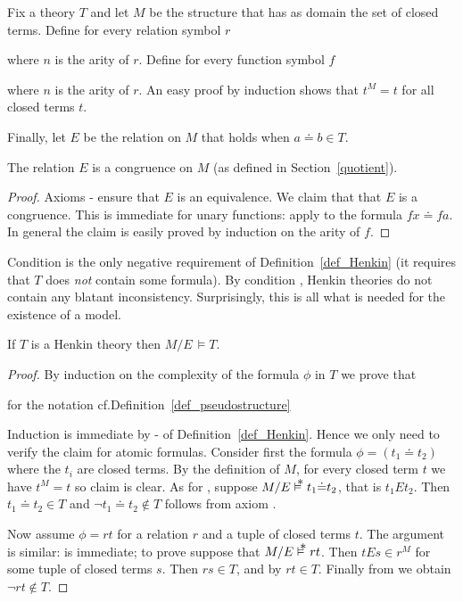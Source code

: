 Fix a theory $T$ and let \emph{$M$} be the structure that has as domain the set of closed terms. Define for every relation symbol $r$


where $n$ is the arity of $r$.
%
Define for every function symbol $f$


where $n$ is the arity of $r$.
%
An easy proof by induction shows that $t^M=t$ for all closed terms $t$. 

Finally, let \emph{$E$} be the relation on $M$ that holds when $a{\doteq}b\in T$. 

\begin{lemma}
The relation $E$ is a congruence on $M$ (as defined in Section~\ref{quotient}).
\end{lemma}

\begin{proof}
Axioms - ensure that $E$ is an equivalence. We claim that that $E$ is a congruence. This is immediate for unary functions: apply  to the formula $fx\doteq fa$. In general the claim is easily proved by induction on the arity of $f$.
\end{proof}

Condition  is the only negative requirement of Definition~\ref{def_Henkin} (it requires that $T$ does \textit{not\/} contain some formula). By condition , Henkin theories do not contain any blatant inconsistency. Surprisingly, this is all what is needed for the existence of a model.

\begin{theorem}
If $T$ is a Henkin theory then $M{/}E\,\models T$. 
\end{theorem}

\begin{proof}
By induction on the complexity of the formula $\phi$ in $T$ we prove that

\hfill for the notation cf.\@ Definition~\ref{def_pseudostructure}


Induction is immediate by - of Definition~\ref{def_Henkin}.
%
Hence we only need to verify the claim for atomic formulas.
%
Consider first the formula $\phi= (t_1{\doteq}t_2)$ where the $t_i$ are closed terms.
%
By the definition of $M$, for every closed term $t$ we have $t^M=t$ so claim  is clear. As for , suppose $M/E\pmodels t_1{\doteq}t_2$, that is  $t_1Et_2$.
Then $t_1{\doteq}t_2\in T$ and $\neg t_1{\doteq}t_2\notin T$ follows from axiom .

Now assume $\phi=rt$ for a relation $r$ and a tuple of closed terms $t$. The argument is similar:  is immediate; to prove  suppose that $M/E\pmodels rt$. Then $tEs\in r^M$ for some tuple of closed terms $s$. Then $rs\in T$, and by  $rt\in T$. Finally from  we obtain $\neg rt\notin T$.
\end{proof}

